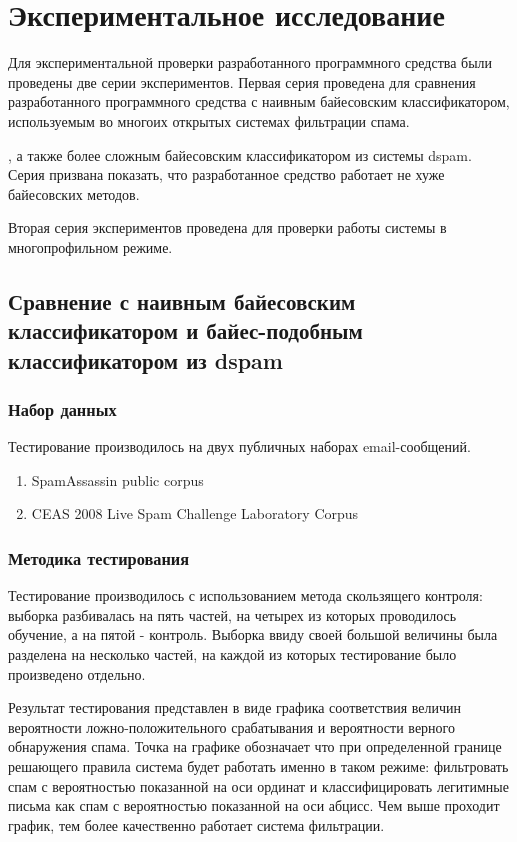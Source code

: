 \section{Экспериментальное исследование}

Для экспериментальной проверки разработанного программного средства были проведены две серии экспериментов. Первая серия проведена для сравнения разработанного программного средства с наивным байесовским классификатором, используемым во многоих открытых системах фильтрации спама.

, а также более сложным байесовским классификатором из системы dspam. Серия призвана показать, что разработанное средство работает не хуже байесовских методов.

Вторая серия экспериментов проведена для проверки работы системы в многопрофильном режиме.

\subsection{Сравнение с наивным байесовским классификатором и байес-подобным классификатором из dspam}

\subsubsection {Набор данных}

Тестирование производилось на двух публичных наборах email-сообщений.

\begin{enumerate}
	\item SpamAssassin public corpus \cite{SAPC}
	\item CEAS 2008 Live Spam Challenge Laboratory Corpus \cite{CEAS}
\end{enumerate}

\subsubsection{Методика тестирования}

Тестирование производилось с использованием метода скользящего контроля: выборка разбивалась на пять частей, на четырех из которых проводилось обучение, а на пятой - контроль. Выборка \cite{CEAS} ввиду своей большой величины была разделена на несколько частей, на каждой из которых тестирование было произведено отдельно. 

Результат тестирования представлен в виде графика соответствия величин вероятности ложно-положительного срабатывания и вероятности верного обнаружения спама. Точка на графике обозначает что при определенной границе решающего правила система будет работать именно в таком режиме: фильтровать спам с вероятностью показанной на оси ординат и классифицировать легитимные письма как спам с вероятностью показанной на оси абцисс. Чем выше проходит график, тем более качественно работает система фильтрации.

